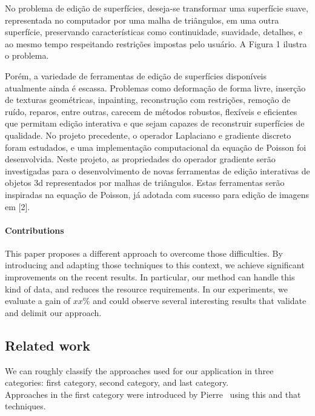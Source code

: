 No problema de edição de superfícies, deseja-se transformar uma superfície suave, representada no 
computador por uma malha de triângulos, em uma outra superfície, preservando características como 
continuidade, suavidade, detalhes, e ao mesmo tempo respeitando restrições impostas pelo usuário. A 
Figura 1 ilustra o problema.

Porém, a variedade de ferramentas de edição de superfícies disponíveis atualmente ainda é escassa. 
Problemas como deformação de forma livre, inserção de texturas geométricas, inpainting, reconstrução 
com restrições, remoção de ruído, reparos, entre outras, carecem de métodos robustos, flexíveis e 
eficientes que permitam edição interativa e que sejam capazes de reconstruir superfícies de qualidade. 
No projeto precedente, o operador Laplaciano e gradiente discreto foram estudados, e uma 
implementação computacional da equação de Poisson foi desenvolvida. Neste projeto, as propriedades do 
operador gradiente serão investigadas para o desenvolvimento de novas ferramentas de edição interativas 
de objetos 3d representados por malhas de triângulos. Estas ferramentas serão inspiradas na equação de 
Poisson, já adotada com sucesso para edição de imagens em [2].


\paragraph*{Contributions}
%
This paper proposes a different approach to overcome those difficulties. By introducing and adapting those techniques to this context, we achieve significant improvements on the recent results. In particular, our method can handle this kind of data, and reduces the resource requirements. In our experiments, we evaluate a gain of $xx\%$ and could observe several interesting results that validate and delimit our approach.


\subsection{Related work}
%
We can roughly classify the approaches used for our application in three categories: first category, second category, and last category.\\
Approaches in the first category were introduced by Pierre~\cite{Sibgrapi2014} using this and that techniques.



